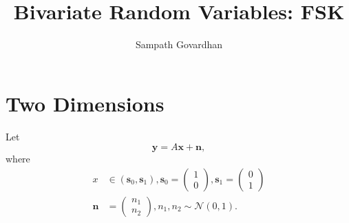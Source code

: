 \documentclass[journal,10pt,twocolumn]{article}
\providecommand{\mbf}{\mathbf}
\providecommand{\brak}[1]{\ensuremath{\left(#1\right)}}
\providecommand{\gauss}[2]{\mathcal{N}\ensuremath{\left(#1,#2\right)}}
\begin{document}
\title{Bivariate Random Variables: FSK}
\author{Sampath Govardhan}

\maketitle

\tableofcontents

\bigskip

\fi

\section{Two Dimensions}
Let 
\begin{equation}
\mbf{y} = A\mbf{x} + \mbf{n},
\end{equation}
where 
\begin{align}
x &\in \brak{\mbf{s}_0,\mbf{s}_1}, 
\mbf{s}_0 = 
\begin{pmatrix}
1 
\\
0
\end{pmatrix},
\mbf{s}_1 = 
\begin{pmatrix}
0 
\\
1
\end{pmatrix}
\\
\mbf{n} &= 
\begin{pmatrix}
n_1
\\
n_2
\end{pmatrix},
n_1,n_2 \sim \gauss{0}{1}.
\end{align}
%
\end{document}

